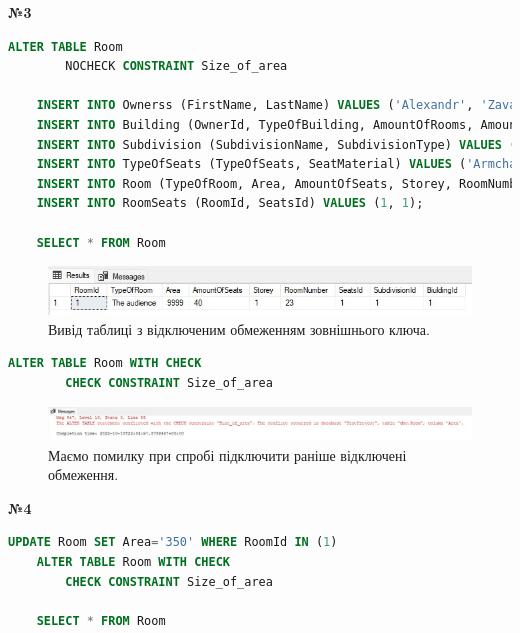 \documentclass[a4paper,12pt]{article}
\begin{document}
	\begin{center}
		\textbf{№3}
	\end{center}
	\begin{lstlisting}[language=SQL]
	ALTER TABLE Room
		NOCHECK CONSTRAINT Size_of_area
	
	INSERT INTO Ownerss (FirstName, LastName) VALUES ('Alexandr', 'Zavalii');
	INSERT INTO Building (OwnerId, TypeOfBuilding, AmountOfRooms, AmountOfFloors) VALUES (1, 'Enterprise', 30, 3);
	INSERT INTO Subdivision (SubdivisionName, SubdivisionType) VALUES ('Lab', 'Chemical');
	INSERT INTO TypeOfSeats (TypeOfSeats, SeatMaterial) VALUES ('Armchairs','Leather');
	INSERT INTO Room (TypeOfRoom, Area, AmountOfSeats, Storey, RoomNumber, SeatsId, SubdivisionId, BiuldingId) VALUES ('The audience', 9999, 40, 1, 23, 1, 1, 1);
	INSERT INTO RoomSeats (RoomId, SeatsId) VALUES (1, 1);
	
	SELECT * FROM Room
	\end{lstlisting}
	\begin{figure}[h!]
		\centering
		\begin{minipage}[h]{1\linewidth}
			\includegraphics[width=1\linewidth]{Prt sc/Figure_1.jpg}  
		\end{minipage}
		\caption{Вивід таблиці з відключеним обмеженням зовнішнього ключа.}
	\end{figure}
\newpage
	\begin{lstlisting}[language=SQL]
	ALTER TABLE Room WITH CHECK
		CHECK CONSTRAINT Size_of_area
	\end{lstlisting}
	\begin{figure}[h!]
		\centering
		\begin{minipage}[h]{1.05\linewidth}
			\includegraphics[width=1\linewidth]{Prt sc/Figure_2.jpg}  
		\end{minipage}
		\caption{Маємо помилку при спробі підключити раніше відключені обмеження.}
	\end{figure}
	\begin{center}
		\textbf{№4}
	\end{center}
	\begin{lstlisting}[language=SQL]
	UPDATE Room SET Area='350' WHERE RoomId IN (1)
	ALTER TABLE Room WITH CHECK
		CHECK CONSTRAINT Size_of_area
		
	SELECT * FROM Room
	\end{lstlisting}
\end{document}
